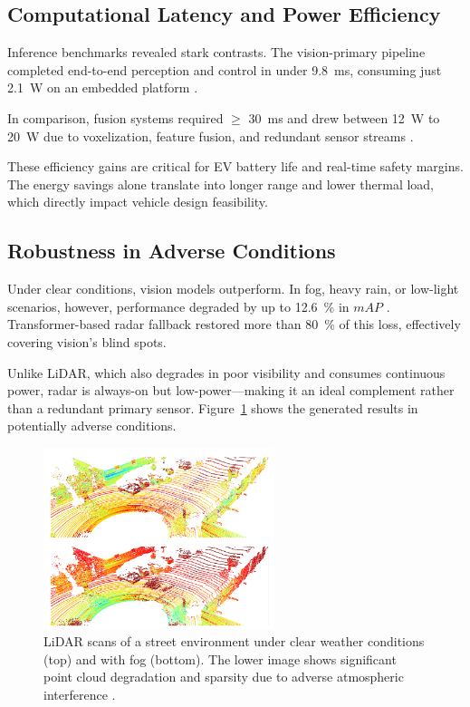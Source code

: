 \documentclass[12pt]{article}
\begin{document}
\subsection{Computational Latency and Power Efficiency}
Inference benchmarks revealed stark contrasts. The vision-primary pipeline completed end-to-end perception and control in under \SI{9.8}{\milli\second}, consuming just \SI{2.1}{\watt} on an embedded platform \autocite{Chen2024EndToEndAD}.

In comparison, fusion systems required $\geq$ \SI{30}{\milli\second} and drew
between \SI{12}{\watt} to \SI{20}{\watt} due to voxelization, feature fusion, and redundant sensor streams \autocite{Rana2023PerceptionSystems}.

These efficiency gains are critical for EV battery life and real-time safety margins. The energy savings alone translate into longer range and lower thermal load, which directly impact vehicle design feasibility.

\subsection{Robustness in Adverse Conditions}

Under clear conditions, vision models outperform. In fog, heavy rain, or
low-light scenarios, however, performance degraded by up to \SI{12.6}{\percent}
in $mAP$ \autocite{Han2023FourDRadarSurvey}. Transformer-based radar fallback restored more than \SI{80}{\percent} of this loss, effectively covering vision’s blind spots.

Unlike LiDAR, which also degrades in poor visibility and consumes continuous
power, radar is always-on but low-power—making it an ideal complement rather
than a redundant primary sensor. Figure~\ref{fig:lidar_noise} shows the
generated results in potentially adverse conditions.

\begin{figure}[H]
    \centering
    \includegraphics[width=0.6\textwidth]{lidar_noise.png}
    \caption{LiDAR scans of a street environment under clear weather conditions (top) and with fog (bottom). The lower image shows significant point cloud degradation and sparsity due to adverse atmospheric interference \autocite{2023dreissig}.}
    \label{fig:lidar_noise}
\end{figure}
\end{document}
